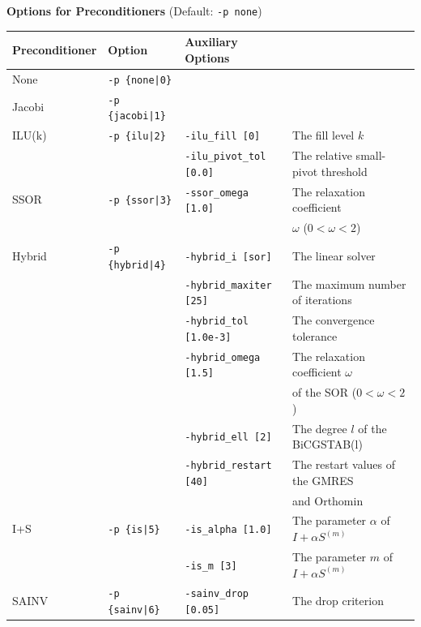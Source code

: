 \documentclass[a4paper]{article}
\begin{document}
\begin{minipage}[t]{\textwidth}
\begin{center}
{\bf Options for Preconditioners} (Default: \verb=-p none=)\\
\begin{tabular}{l|lll}\hline\hline
Preconditioner   & Option           & Auxiliary Options \\ \hline
None     & \verb=-p {none|0}=    &   \\
Jacobi   & \verb=-p {jacobi|1}=  &     \\
ILU(k)   & \verb=-p {ilu|2}=     & \verb=-ilu_fill [0]=        & The fill level $k$ \\
         &                       & \verb=-ilu_pivot_tol [0.0]= & The relative small-pivot threshold \\
SSOR     & \verb=-p {ssor|3}=    & \verb=-ssor_omega [1.0]=    & The relaxation coefficient \\
         &                       &                             & $\omega$ ($0<\omega<2$) \\
Hybrid   & \verb=-p {hybrid|4}=  & \verb=-hybrid_i [sor]=      & The linear solver\\
         &                       & \verb=-hybrid_maxiter [25]= & The maximum number of iterations \\
         &                       & \verb=-hybrid_tol [1.0e-3]= & The convergence tolerance \\
         &                       & \verb=-hybrid_omega [1.5]=  & The relaxation coefficient $\omega$ \\
         &                       &                             & of the SOR ($0<\omega<2$) \\
         &                       & \verb=-hybrid_ell [2]=      & The degree $l$ of the BiCGSTAB(l) \\
         &                       & \verb=-hybrid_restart [40]= & The restart values of the GMRES \\
         &                       &                             & and Orthomin \\
I+S      & \verb=-p {is|5}=      & \verb=-is_alpha [1.0]=      & The parameter $\alpha$ of $I+\alpha S^{(m)}$ \\
         &                       & \verb=-is_m [3]=            & The parameter $m$ of $I+\alpha S^{(m)}$ \\
SAINV    & \verb=-p {sainv|6}=   & \verb=-sainv_drop [0.05]=   & The drop criterion\\

\end{tabular}
\end{center}
\end{minipage}
\end{document}
